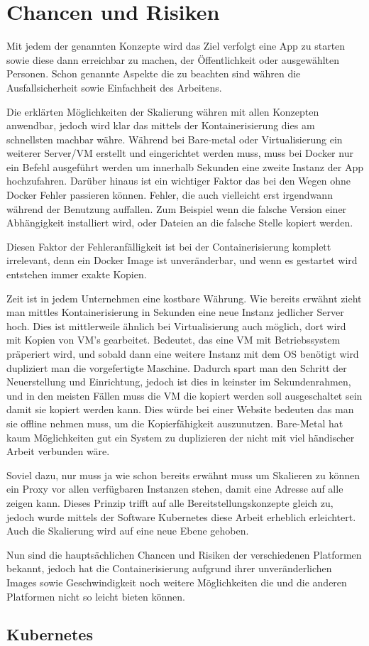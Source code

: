 \newpage
\section{Chancen und Risiken}
Mit jedem der genannten Konzepte wird das Ziel verfolgt eine App zu starten sowie diese dann erreichbar zu machen, der Öffentlichkeit oder ausgewählten Personen.
Schon genannte Aspekte die zu beachten sind währen die Ausfallsicherheit sowie Einfachheit des Arbeitens.

Die erklärten Möglichkeiten der Skalierung währen mit allen Konzepten anwendbar, jedoch wird klar das mittels der Kontainerisierung dies am schnellsten machbar währe.
Während bei Bare-metal oder Virtualisierung ein weiterer Server/VM erstellt und eingerichtet werden muss, muss bei Docker nur ein Befehl ausgeführt werden um innerhalb Sekunden eine zweite 
Instanz der App hochzufahren.
Darüber hinaus ist ein wichtiger Faktor das bei den Wegen ohne Docker Fehler passieren können. Fehler, die auch vielleicht erst irgendwann während der Benutzung auffallen.
Zum Beispiel wenn die falsche Version einer Abhängigkeit installiert wird, oder Dateien an die falsche Stelle kopiert werden.

Diesen Faktor der Fehleranfälligkeit ist bei der Containerisierung komplett irrelevant, denn ein Docker Image ist unveränderbar, und wenn es gestartet wird 
entstehen immer exakte Kopien.

Zeit ist in jedem Unternehmen eine kostbare Währung. Wie bereits erwähnt zieht man mittles Kontainerisierung in Sekunden eine neue Instanz jedlicher Server hoch.
Dies ist mittlerweile ähnlich bei Virtualisierung auch möglich, dort wird mit Kopien von VM's gearbeitet. Bedeutet, das eine VM mit Betriebssystem präperiert wird, und
sobald dann eine weitere Instanz mit dem OS benötigt wird dupliziert man die vorgefertigte Maschine. Dadurch spart man den Schritt der Neuerstellung und Einrichtung, jedoch
ist dies in keinster im Sekundenrahmen, und in den meisten Fällen muss die VM die kopiert werden soll ausgeschaltet sein damit sie kopiert werden kann. 
Dies würde bei einer Website bedeuten das man sie offline nehmen muss, um die Kopierfähigkeit auszunutzen.
Bare-Metal hat kaum Möglichkeiten gut ein System zu duplizieren der nicht mit viel händischer Arbeit verbunden wäre.

Soviel dazu, nur muss ja wie schon bereits erwähnt muss um Skalieren zu können ein Proxy vor allen verfügbaren Instanzen stehen, damit eine Adresse auf alle zeigen kann.
Dieses Prinzip trifft auf alle Bereitstellungskonzepte gleich zu, jedoch wurde mittels der Software Kubernetes diese Arbeit erheblich erleichtert. Auch die Skalierung
wird auf eine neue Ebene gehoben.

Nun sind die hauptsächlichen Chancen und Risiken der verschiedenen Platformen bekannt, jedoch hat die Containerisierung aufgrund ihrer 
unveränderlichen Images sowie Geschwindigkeit noch weitere Möglichkeiten die und die anderen Platformen nicht so leicht bieten können.

\subsection{Kubernetes}
